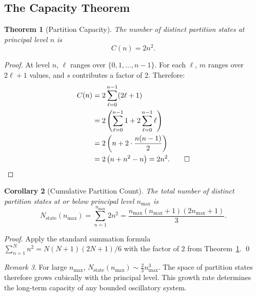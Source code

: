\documentclass[twocolumn,10pt,a4paper]{article}
\theoremstyle{thmstyle}
\newtheorem{theorem}{Theorem}[section]
\newtheorem{corollary}[theorem]{Corollary}
\theoremstyle{definition}
\theoremstyle{remark}
\newtheorem{remark}[theorem]{Remark}
\newcommand{\Nstate}{N_{\mathrm{state}}}
\begin{document}
\subsection{The Capacity Theorem}

\begin{theorem}[Partition Capacity]
\label{thm:capacity}
The number of distinct partition states at principal level $n$ is
\begin{equation}
    C(n) = 2n^2.
    \label{eq:capacity}
\end{equation}
\end{theorem}

\begin{proof}
At level $n$, $\ell$ ranges over $\{0, 1, \ldots, n-1\}$. For each $\ell$, $m$ ranges over $2\ell + 1$ values, and $s$ contributes a factor of 2. Therefore:
\begin{align}
    C(n) &= 2 \sum_{\ell=0}^{n-1} (2\ell + 1) \notag \\
         &= 2 \left( \sum_{\ell=0}^{n-1} 1 + 2\sum_{\ell=0}^{n-1}\ell \right) \notag \\
         &= 2 \left( n + 2 \cdot \frac{n(n-1)}{2} \right) \notag \\
         &= 2 \left( n + n^2 - n \right) = 2n^2. \qed
\end{align}
\end{proof}

\begin{corollary}[Cumulative Partition Count]
\label{cor:cumulative}
The total number of distinct partition states at or below principal level $n_{\max}$ is
\begin{equation}
    \Nstate(n_{\max}) = \sum_{n=1}^{n_{\max}} 2n^2 = \frac{n_{\max}(n_{\max}+1)(2n_{\max}+1)}{3}.
    \label{eq:cumulative}
\end{equation}
\end{corollary}

\begin{proof}
Apply the standard summation formula $\sum_{n=1}^{N} n^2 = N(N+1)(2N+1)/6$ with the factor of 2 from Theorem~\ref{thm:capacity}. \qed
\end{proof}

\begin{remark}
For large $n_{\max}$, $\Nstate(n_{\max}) \sim \frac{2}{3} n_{\max}^3$. The space of partition states therefore grows cubically with the principal level. This growth rate determines the long-term capacity of any bounded oscillatory system.
\end{remark}
\end{document}

